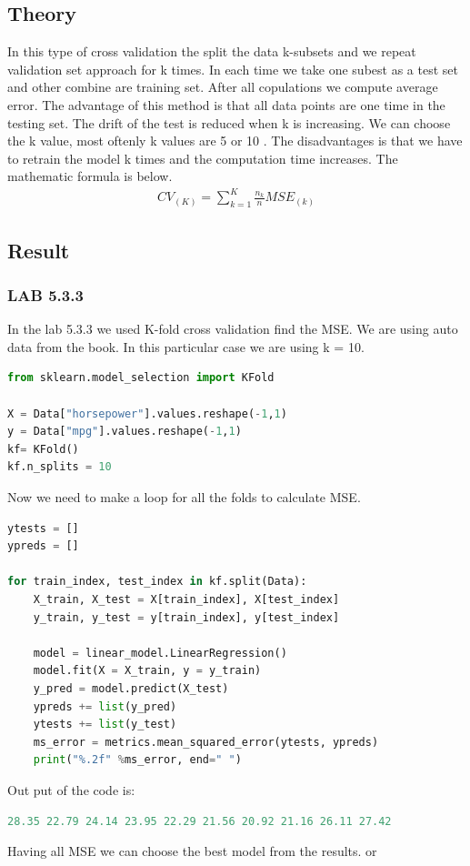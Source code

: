 \subsection{Theory}
In this type of cross validation the split the data k-subsets and we repeat validation set approach for k times. In each time we take one subest as a test set and other combine are training set. After all copulations we compute average error. The advantage of this method is that all data points are one time in the testing set. The drift of the test is reduced when k is increasing. We can choose the k value, most oftenly k values are 5 or 10 . The disadvantages is that we have to retrain the model k times and the computation time increases. The mathematic formula is below. 
\begin{align}\label{fo:k-fold}
CV_{(K)} = \sum_{k=1}^{K}  \frac {n_{k}}{n}MSE_{(k)}
\end{align}

\subsection{Result}
\subsubsection*{LAB 5.3.3}%
In the lab 5.3.3 we used K-fold cross validation find the MSE. We are using auto data from the book. In this particular case we are using k = 10. 
\begin{lstlisting}[language=Python]
from sklearn.model_selection import KFold

X = Data["horsepower"].values.reshape(-1,1) 
y = Data["mpg"].values.reshape(-1,1)
kf= KFold()
kf.n_splits = 10
\end{lstlisting}
Now we need to make a loop for all the folds to calculate MSE.   

\begin{lstlisting}[language=Python]
ytests = []
ypreds = []

for train_index, test_index in kf.split(Data):
	X_train, X_test = X[train_index], X[test_index]
	y_train, y_test = y[train_index], y[test_index]

	model = linear_model.LinearRegression()
	model.fit(X = X_train, y = y_train)
	y_pred = model.predict(X_test)  
	ypreds += list(y_pred)
	ytests += list(y_test)
	ms_error = metrics.mean_squared_error(ytests, ypreds)
	print("%.2f" %ms_error, end=" ")
\end{lstlisting}
Out put of the code is:
\begin{lstlisting}[language=Python]
28.35 22.79 24.14 23.95 22.29 21.56 20.92 21.16 26.11 27.42 
\end{lstlisting}
Having all MSE we can choose the best model from the results. or 